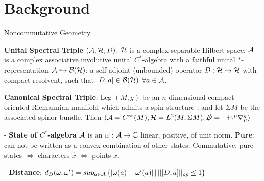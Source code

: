 \section{Background}

\begin{frame}{Noncommutative Geometry} %
    
    \textbf{Unital Spectral Triple} $(\mathcal A , \mathcal H, D)$: $\mathcal H$ is a complex separable Hilbert space; $\mathcal A$ is a complex associative involutive unital $C^*$-algebra with a faithful unital $*$-representation $\mathcal A \hookrightarrow \mathcal B(\mathcal H)$; a self-adjoint (unbounded) operator $D: \mathcal H \to \mathcal H$ with compact resolvent, such that $[D, a] \in \mathcal B(\mathcal H)$ $\forall a \in \mathcal A$.
    
    \textbf{Canonical Spectral Triple}: Leg $(M, g)$ be an $n$-dimensional compact oriented Riemannian manifold which admits a spin structure%
    , and let $\Sigma M$ %
    be the associated spinor bundle. Then $(\mathcal A = C^\infty(M), \mathcal H = L^2(M, \Sigma M), \slashed D = -i \gamma^\mu \nabla^g_\mu)$%
    
    - \textbf{State of $C^*$-algebra} $\mathcal A$ is an $\omega : \mathcal A \to \mathbb C$ linear, positive, of unit norm. \textbf{Pure}: can not be written as a convex combination of other states. Commutative: pure states $\Longleftrightarrow$ characters $\hat x$ $\Longleftrightarrow$ points $x$.
    
    - \textbf{Distance}: $d_D(\omega, \omega') = sup_{a \in \mathcal A} \left\{|\omega(a) - \omega'(a)| \, | \, ||[D, a]||_{op} \leq 1 \right\}$
    
\end{frame}


